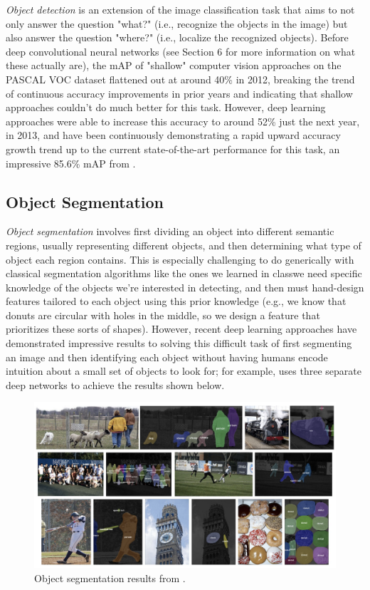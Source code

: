 ﻿\documentclass{article}
\begin{document}
\textit{Object detection} is an extension of the image classification task that aims to not only answer the question "what?" (i.e., recognize the objects in the image) but also answer the question "where?" (i.e., localize the recognized objects). Before deep convolutional neural networks (see Section 6 for more information on what these actually are), the mAP of "shallow" computer vision approaches on the PASCAL VOC dataset \cite{everingham2015pascal} flattened out at around 40\% in 2012, breaking the trend of continuous accuracy improvements in prior years and indicating that shallow approaches couldn't do much better for this task. However, deep learning approaches were able to increase this accuracy to around 52\% just the next year, in 2013, and have been continuously demonstrating a rapid upward accuracy growth trend up to the current state-of-the-art performance for this task, an impressive 85.6\% mAP from \cite{he2016deep}.

\subsection{Object Segmentation}

\textit{Object segmentation} involves first dividing an object into different semantic regions, usually representing different objects, and then determining what type of object each region contains. This is especially challenging to do generically with classical segmentation algorithms like the ones we learned in class\textemdash we need specific knowledge of the objects we're interested in detecting, and then must hand-design features tailored to each object using this prior knowledge (e.g., we know that donuts are circular with holes in the middle, so we design a feature that prioritizes these sorts of shapes). However, recent deep learning approaches have demonstrated impressive results to solving this difficult task of first segmenting an image and then identifying each object without having humans encode intuition about a small set of objects to look for; for example, \cite{semseg} uses three separate deep networks to achieve the results shown below.


\begin{figure}[b]
\includegraphics[width=12cm]{segmentation.png}
\centering
\caption{Object segmentation results from \cite{semseg}.}
\end{figure}
\end{document}
